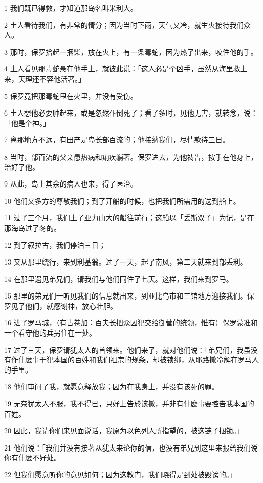 \par 1 我们既已得救，才知道那岛名叫米利大。
\par 2 土人看待我们，有非常的情分；因为当时下雨，天气又冷，就生火接待我们众人。
\par 3 那时，保罗拾起一捆柴，放在火上，有一条毒蛇，因为热了出来，咬住他的手。
\par 4 土人看见那毒蛇悬在他手上，就彼此说：「这人必是个凶手，虽然从海里救上来，天理还不容他活著。」
\par 5 保罗竟把那毒蛇甩在火里，并没有受伤。
\par 6 土人想他必要肿起来，或是忽然仆倒死了；看了多时，见他无害，就转念，说：「他是个神。」
\par 7 离那地方不远，有田产是岛长部百流的；他接纳我们，尽情款待三日。
\par 8 当时，部百流的父亲患热病和痢疾躺著。保罗进去，为他祷告，按手在他身上，治好了他。
\par 9 从此，岛上其余的病人也来，得了医治。
\par 10 他们又多方的尊敬我们；到了开船的时候，也把我们所需用的送到船上。
\par 11 过了三个月，我们上了亚力山大的船往前行；这船以「丢斯双子」为记，是在那海岛过了冬的。
\par 12 到了叙拉古，我们停泊三日；
\par 13 又从那里绕行，来到利基翁。过了一天，起了南风，第二天就来到部丢利。
\par 14 在那里遇见弟兄们，请我们与他们同住了七天。这样，我们来到罗马。
\par 15 那里的弟兄们一听见我们的信息就出来，到亚比乌市和三馆地方迎接我们。保罗见了他们，就感谢神，放心壮胆。
\par 16 进了罗马城，（有古卷加：百夫长把众囚犯交给御营的统领，惟有）保罗蒙准和一个看守他的兵另住在一处。
\par 17 过了三天，保罗请犹太人的首领来。他们来了，就对他们说：「弟兄们，我虽没有作什麽事干犯本国的百姓和我们祖宗的规条，却被锁绑，从耶路撒冷解在罗马人的手里。
\par 18 他们审问了我，就愿意释放我；因为在我身上，并没有该死的罪。
\par 19 无奈犹太人不服，我不得已，只好上告於该撒，并非有什麽事要控告我本国的百姓。
\par 20 因此，我请你们来见面说话，我原为以色列人所指望的，被这链子捆锁。」
\par 21 他们说：「我们并没有接著从犹太来论你的信，也没有弟兄到这里来报给我们说你有什麽不好处。
\par 22 但我们愿意听你的意见如何；因为这教门，我们晓得是到处被毁谤的。」
